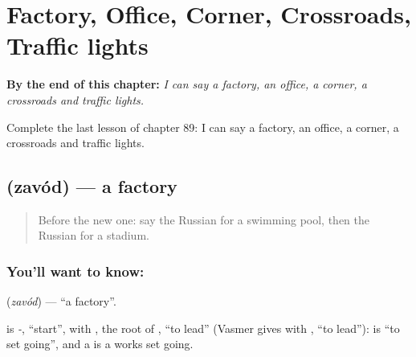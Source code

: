 
\chapter{Factory, Office, Corner, Crossroads, Traffic lights}
\label{ch:ru-factory-office-corner-crossroads-traffic-lights}

\begin{chapteropening}
\textbf{By the end of this chapter:} \emph{I can say a factory, an office, a corner, a crossroads and traffic lights.}

Complete the last lesson of chapter 89: I can say a factory, an office, a corner, a crossroads and traffic lights.
\end{chapteropening}

\section[\texorpdfstring{\ru{завод} (zavód)}{завод (zavód)}]{ (zavód) — a factory}

\label{lesson:RU-C89-factory}



\begin{quote}
Before the new one: say the Russian for a swimming pool, then the Russian for a stadium.
\end{quote}

\subsection*{You'll want to know: }
\textbf{} (\emph{zavód}) — \textquotedblleft{}a factory\textquotedblright{}.

\begin{cousinweb}
\textbf{} is \emph{-}, \textquotedblleft{}start\textquotedblright{}, with \emph{}, the root of \emph{}, \textquotedblleft{}to lead\textquotedblright{} (Vasmer gives \emph{} with \emph{}, \textquotedblleft{}to lead\textquotedblright{}): \emph{} is \textquotedblleft{}to set going\textquotedblright{}, and a \emph{} is a works set going.
\end{cousinweb}

